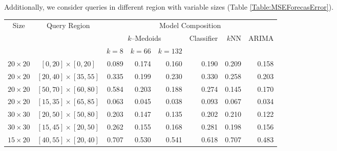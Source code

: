 Additionally, we consider queries in different region with variable sizes (Table \ref{Table:MSEForecasError}). 

\begin{table}[h]	
    \centering
	\small
	\begin{tabular}{|c|c|r|r|r|r|r|r|}
		\hline
		\multirow{3}{*}{Size} & \multirow{3}{*}{Query Region} & \multicolumn{6}{c|}{Model Composition} \\ 
		\cline{3-8}
		& & \multicolumn{3}{c|}{$k$--Medoids} & \multirow{2}{*}{Classifier} & \multirow{2}{*}{$k$NN} & \multirow{2}{*}{ARIMA} \\ 
		\cline{3-5}
		& & $k =8$ & $k = 66$ & $k = 132$ &  & & \\ \hline %
		$20 \times 20$ & $[ 0, 20] \times [ 0, 20]$ & 0.089 & 0.174 & 0.160 & \cellcolor{red!20}0.190 & 0.209 & 0.158  \\ %
		$20 \times 20$ & $[20, 40] \times [35, 55]$ & 0.335 & 0.199 & 0.230 & \cellcolor{red!20}0.330 & 0.258 & 0.203 \\ %
		$20 \times 20$ & $[50, 70] \times [60, 80]$ & 0.584 & 0.203 & 0.188 & \cellcolor{red!20}0.274 & 0.145 & 0.170 \\ %
		$20 \times 20$ & $[15, 35] \times [65, 85]$ & 0.063 & 0.045 & 0.038 & \cellcolor{red!20}0.093 & 0.067 & 0.034 \\ %
		$30 \times 30$ & $[20, 50] \times [50, 80]$ & 0.203 & 0.147 & 0.135 & \cellcolor{red!20}0.202 & 0.210 & 0.122 \\ %
		$30 \times 30$ & $[15, 45] \times [20, 50]$ & 0.262 & 0.155 & 0.168 & \cellcolor{red!20}0.281 & 0.198 & 0.156 \\ %
		$15 \times 20$ & $[40, 55] \times [20, 40]$ & 0.707 & 0.530 & 0.541 & \cellcolor{red!20}0.618 & 0.707 & 0.483 \\ %

\end{tabular}
\end{table}
